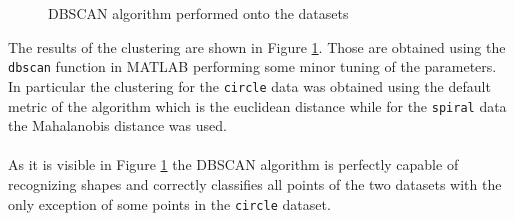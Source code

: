   \begin{figure}[H]
    \centering
    \qquad
    \qquad
    \caption{DBSCAN algorithm performed onto the datasets}
    \label{dbscan_nospectral}
  \end{figure}

  \noindent The results of the clustering are shown in Figure \ref{dbscan_nospectral}. Those are obtained using the \texttt{dbscan} function in MATLAB performing some minor tuning of the parameters. In particular the clustering for the \texttt{circle} data was obtained using the default metric of the algorithm which is the euclidean distance while for the \texttt{spiral} data the Mahalanobis distance was used.
  \\
  \\
As it is visible in Figure \ref{dbscan_nospectral} the DBSCAN algorithm is perfectly capable of recognizing shapes and correctly classifies all points of the two datasets with the only exception of some points in the \texttt{circle} dataset. 
